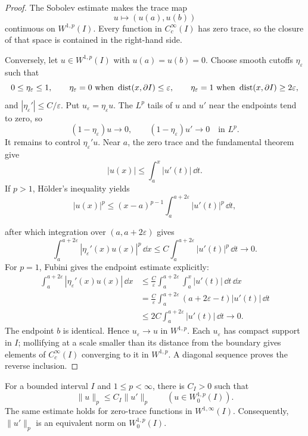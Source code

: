 \begin{proof}
The Sobolev estimate makes the trace map
\[
  u\longmapsto(u(a),u(b))
\]
continuous on $W^{1,p}(I)$.  Every function in $C_c^\infty(I)$ has zero trace,
so the closure of that space is contained in the right-hand side.

Conversely, let $u\in W^{1,p}(I)$ with $u(a)=u(b)=0$.  Choose smooth cutoffs
$\eta_\varepsilon$ such that
\[
  0\le\eta_\varepsilon\le1,
  \qquad
  \eta_\varepsilon=0
  \text{ when }\operatorname{dist}(x,\partial I)\le\varepsilon,
  \qquad
  \eta_\varepsilon=1
  \text{ when }\operatorname{dist}(x,\partial I)\ge2\varepsilon,
\]
and $|\eta_\varepsilon'|\le C/\varepsilon$.  Put
$u_\varepsilon=\eta_\varepsilon u$.  The $L^p$ tails of $u$ and $u'$ near the
endpoints tend to zero, so
\[
  (1-\eta_\varepsilon)u\to0,
  \qquad
  (1-\eta_\varepsilon)u'\to0
  \quad\text{in }L^p.
\]
It remains to control $\eta_\varepsilon'u$.  Near $a$, the zero trace and the
fundamental theorem give
\[
  |u(x)|\le\int_a^x|u'(t)|\,\dd t.
\]
If $p>1$, Hölder's inequality yields
\[
  |u(x)|^p
  \le (x-a)^{p-1}\int_a^{a+2\varepsilon}|u'(t)|^p\,\dd t,
\]

after which integration over $(a,a+2\varepsilon)$ gives
\[
  \int_a^{a+2\varepsilon}
       |\eta_\varepsilon'(x)u(x)|^p\,\dd x
  \le C\int_a^{a+2\varepsilon}|u'(t)|^p\,\dd t\longrightarrow0.
\]
For $p=1$, Fubini gives the endpoint estimate explicitly:
\[
\begin{aligned}
  \int_a^{a+2\varepsilon}|\eta_\varepsilon'(x)u(x)|\,\dd x
  &\le \frac C\varepsilon
       \int_a^{a+2\varepsilon}\int_a^x|u'(t)|\,\dd t\,\dd x \\
  &=\frac C\varepsilon
       \int_a^{a+2\varepsilon}(a+2\varepsilon-t)|u'(t)|\,\dd t \\
  &\le 2C\int_a^{a+2\varepsilon}|u'(t)|\,\dd t
  \longrightarrow0.
\end{aligned}
\]
The endpoint $b$ is identical.  Hence $u_\varepsilon\to u$ in $W^{1,p}$.
Each $u_\varepsilon$ has compact support in $I$; mollifying at a scale smaller
than its distance from the boundary gives elements of $C_c^\infty(I)$
converging to it in $W^{1,p}$.  A diagonal sequence proves the reverse
inclusion.
\end{proof}

\begin{notetheorem}
For a bounded interval $I$ and $1\le p<\infty$, there is $C_I>0$ such that
\[
  \|u\|_p\le C_I\|u'\|_p
  \qquad(u\in W_0^{1,p}(I)).
\]
The same estimate holds for zero-trace functions in $W^{1,\infty}(I)$.
Consequently, $\|u'\|_p$ is an equivalent norm on $W_0^{1,p}(I)$.
\end{notetheorem}

